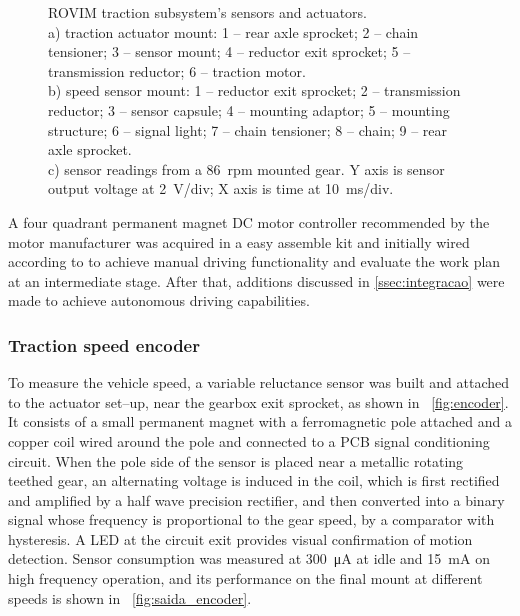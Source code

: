\documentclass[journal]{IEEEtran}
\begin{document}
\begin{figure}[!t]
        \caption[]{ROVIM traction subsystem's sensors and actuators.\\\hspace{\textwidth}a) traction actuator mount: 1 -- rear axle sprocket; 2 -- chain tensioner; 3 -- sensor mount; 4 -- reductor exit sprocket; 5 -- transmission reductor; 6 -- traction motor.\\\hspace{\textwidth}b) speed sensor mount: 1 -- reductor exit sprocket; 2 -- transmission reductor; 3 -- sensor capsule; 4 -- mounting adaptor; 5 -- mounting structure; 6 -- signal light; 7 -- chain tensioner; 8 -- chain; 9 -- rear axle sprocket.\\\hspace{\textwidth}c) sensor readings from a \SI{86}{rpm} mounted gear. Y axis is sensor output voltage at \SI{2}{\volt/div}; X axis is time at \SI{10}{\milli\second/div}.}

\end{figure}


A four quadrant permanent magnet \ac{DC} motor controller recommended by the motor manufacturer was acquired in a easy assemble kit and initially wired according to \cite[p. 15]{datasheet_PMT835M} to achieve manual driving functionality and evaluate the work plan at an intermediate stage. After that, additions discussed in \ref{ssec:integracao} were made to achieve autonomous driving capabilities.

\subsubsection{Traction speed encoder}

To measure the vehicle speed, a variable reluctance sensor was built and attached to the actuator set--up, near the gearbox exit sprocket, as shown in \figurename~\ref{fig:encoder}. It consists of a small permanent magnet with a ferromagnetic pole attached and a copper coil wired around the pole and connected to a \ac{PCB} signal conditioning circuit. When the pole side of the sensor is placed near a metallic rotating teethed gear, an alternating voltage is induced in the coil, which is first rectified and amplified by a half wave precision rectifier, and then converted into a binary signal whose frequency is proportional to the gear speed, by a comparator with hysteresis. A \ac{LED} at the circuit exit provides visual confirmation of motion detection. Sensor consumption was measured at \SI{300}{\micro\ampere} at idle and \SI{15}{\milli\ampere} on high frequency operation, and its performance on the final mount at different speeds is shown in \figurename~\ref{fig:saida_encoder}.
\end{document}
